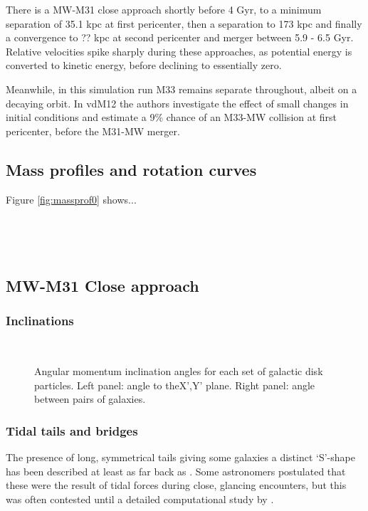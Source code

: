 \documentclass[twocolumn]{aastex63}
\newcommand{\todo}{\color{red}{TODO}\color{black}\hspace{2mm}}
\begin{document}
There is a MW-M31 close approach shortly before 4 Gyr, to a minimum separation of 35.1 kpc at first pericenter, then a separation to 173 kpc and finally a convergence to ?? kpc at second pericenter and merger between 5.9 - 6.5 Gyr. Relative velocities spike sharply during these approaches, as potential energy is converted to kinetic energy, before declining to essentially zero.

Meanwhile, in this simulation run M33 remains separate throughout, albeit on a decaying orbit. In vdM12 the authors investigate the effect of small changes in initial conditions and estimate a 9\% chance of an M33-MW collision at first pericenter, before the M31-MW merger.

\subsection{Mass profiles and rotation curves}

Figure \ref{fig:massprof0} shows... \todo{set xlim, make y axis log}\ 

\todo{identify the bar?}\ 

\todo{sersic profiles at various stages?}\ 

\subsection{MW-M31 Close approach}

\subsubsection{Inclinations}

\todo{Relative rotation axes of disks}\ 

\begin{figure}[ht!]
	\caption{Angular momentum inclination angles for each set of galactic disk particles. Left panel: angle to theX',Y' plane. Right panel: angle between pairs of galaxies.
		\label{fig:inclinations}}
\end{figure}

\subsubsection{Tidal tails and bridges}

The presence of long, symmetrical tails giving some galaxies a distinct `S'-shape has been described at least as far back as \citet{zwicky_novel_1955}. Some astronomers postulated that these were the result of tidal forces during close, glancing encounters, but this was often contested until a detailed computational study by \citet{toomre_galactic_1972}.
\end{document}
